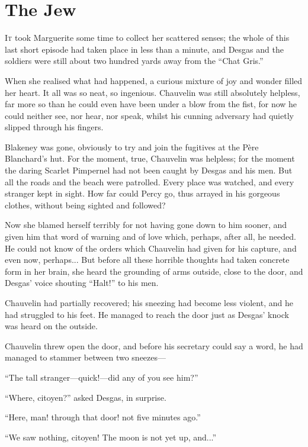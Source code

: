 
\chapter{The Jew}
\lettrine[lines=4]{I}{t} took Marguerite some time to collect her scattered senses; the whole of this last short episode had taken place in less than a minute, and Desgas and the soldiers were still about two hundred yards away from the \enquote{Chat Gris.}

When she realised what had happened, a curious mixture of joy and wonder filled her heart. It all was so neat, so ingenious. Chauvelin was still absolutely helpless, far more so than he could even have been under a blow from the fist, for now he could neither see, nor hear, nor speak, whilst his cunning adversary had quietly slipped through his fingers.

Blakeney was gone, obviously to try and join the fugitives at the Père Blanchard's hut. For the moment, true, Chauvelin was helpless; for the moment the daring Scarlet Pimpernel had not been caught by Desgas and his men. But all the roads and the beach were patrolled. Every place was watched, and every stranger kept in sight. How far could Percy go, thus arrayed in his gorgeous clothes, without being sighted and followed?

Now she blamed herself terribly for not having gone down to him sooner, and given him that word of warning and of love which, perhaps, after all, he needed. He could not know of the orders which Chauvelin had given for his capture, and even now, perhaps... But before all these horrible thoughts had taken concrete form in her brain, she heard the grounding of arms outside, close to the door, and Desgas’ voice shouting \enquote{Halt!} to his men.

Chauvelin had partially recovered; his sneezing had become less violent, and he had struggled to his feet. He managed to reach the door just as Desgas’ knock was heard on the outside.

Chauvelin threw open the door, and before his secretary could say a word, he had managed to stammer between two sneezes---

\enquote{The tall stranger---quick!---did any of you see him?}

\enquote{Where, citoyen?} asked Desgas, in surprise.

\enquote{Here, man! through that door! not five minutes ago.}

\enquote{We saw nothing, citoyen! The moon is not yet up, and...}

